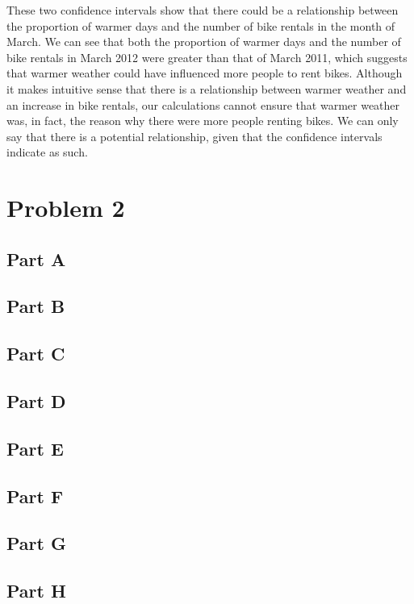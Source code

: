 \documentclass[11pt]{article}
\begin{document}
These two confidence intervals show that there could be a relationship between the proportion of warmer days and the number of bike rentals in the month of March. We can see that both the proportion of warmer days and the number of bike rentals in March 2012 were greater than that of March 2011, which suggests that warmer weather could have influenced more people to rent bikes. Although it makes intuitive sense that there is a relationship between warmer weather and an increase in bike rentals, our calculations cannot ensure that warmer weather was, in fact, the reason why there were more people renting bikes. We can only say that there is a potential relationship, given that the confidence intervals indicate as such. 
\pagebreak



\section{Problem 2}
\label{sec:problem2}
\subsection{Part A}
\label{subsec:2a}
\subsection{Part B}
\label{subsec:2b}
\subsection{Part C}
\label{subsec:2c}
\subsection{Part D}
\label{subsec:2d}
\subsection{Part E}
\label{subsec:2e}
\subsection{Part F}
\label{subsec:2f}
\subsection{Part G}
\label{subsec:2g}
\subsection{Part H}
\label{subsec:2h}
\pagebreak
\end{document}
